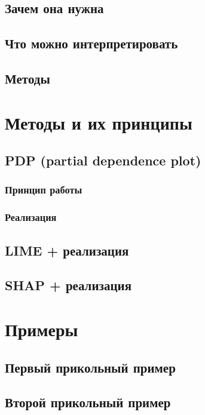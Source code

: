 \documentclass[a4paper, 12pt]{article}
\begin{document}
	\subsection{Зачем она нужна}
		
	\subsection{Что можно интерпретировать}
	
	\subsection{Методы}
	
	\newpage
	
	\section{Методы и их принципы}
	\subsection{PDP (partial dependence plot)}
	
	\subsubsection{Принцип работы}
	
	\subsubsection{Реализация}
	
	\subsection{LIME + реализация}
	
	\subsection{SHAP + реализация}
	
	\newpage

	\section{Примеры}
	\subsection{Первый прикольный пример}
	
	\subsection{Второй прикольный пример}
	
	\newpage
\end{document}
